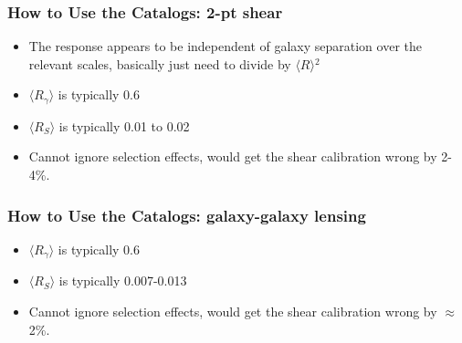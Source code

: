 \documentclass{beamer}
\newcommand{\mcalRmean}{\mbox{\boldmath $\langle R \rangle$}}
\newcommand{\mcalRgmean}{\mbox{\boldmath $\langle R_\gamma \rangle$}}
\newcommand{\mcalRSmean}{\mbox{\boldmath $\langle R_S \rangle$}}
\begin{document}
\frame
{
    \frametitle{How to Use the Catalogs: 2-pt shear}

 
    \begin{itemize}

        \item The response appears to be independent of galaxy separation over
            the relevant scales, basically just need to divide by {\color{gold}
            \mcalRmean$^2$}

        \item {\color{gold} \mcalRgmean} is typically 0.6 
        \item {\color{gold} \mcalRSmean} is typically 0.01 to 0.02

        \item Cannot ignore selection effects, would get the shear calibration
            wrong by 2-4\%.


    \end{itemize}
}

\frame
{
    \frametitle{How to Use the Catalogs: galaxy-galaxy lensing}

 
    \begin{itemize}


        \item {\color{gold} \mcalRgmean} is typically 0.6 
        \item {\color{gold} \mcalRSmean} is typically 0.007-0.013

        \item Cannot ignore selection effects, would get the shear calibration
            wrong by $\approx$2\%.


    \end{itemize}
}
\end{document}

